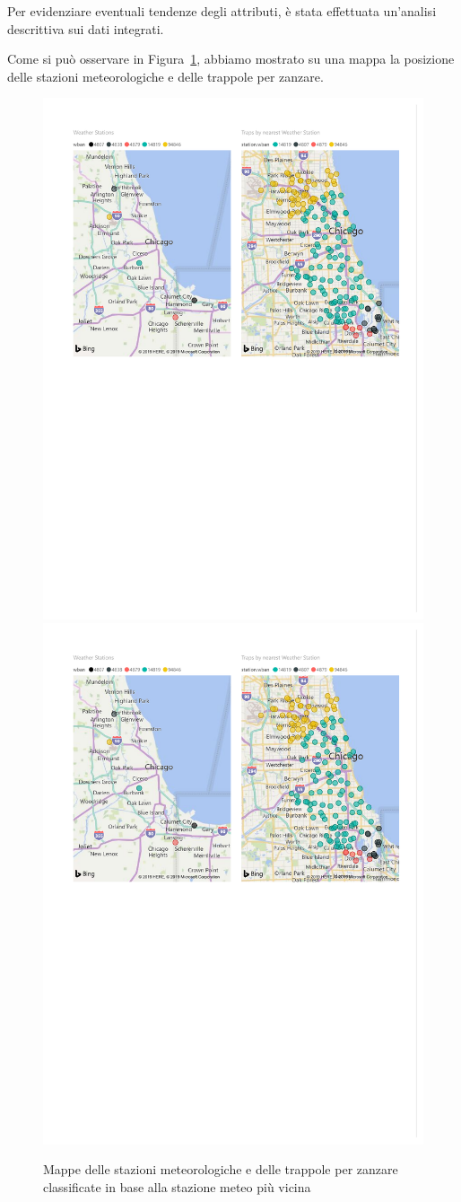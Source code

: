 Per evidenziare eventuali tendenze degli attributi, è stata effettuata 
un'analisi descrittiva sui dati integrati.

Come si può osservare in Figura~\ref{fig:weather-stations}, abbiamo mostrato su 
una mappa la posizione delle stazioni meteorologiche e delle trappole per 
zanzare. 

\begin{figure}[htb]
	\centering
	\includegraphics[width=0.4\columnwidth]{images/WeatherStations}
	\includegraphics[width=0.4\columnwidth]{images/TrapsByNN}
	\caption{Mappe delle stazioni meteorologiche e delle trappole per zanzare 
	classificate in base alla stazione meteo più vicina}
	\label{fig:weather-stations}
\end{figure}

